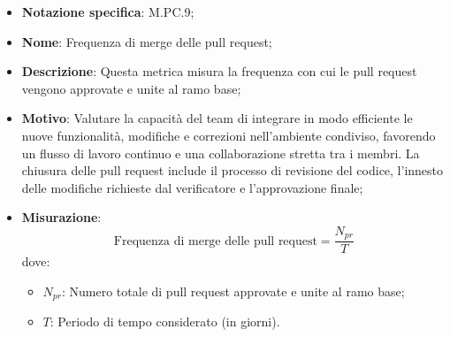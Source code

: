 \begin{itemize}
    \item \textbf{Notazione specifica}: M.PC.9;
    \item \textbf{Nome}: Frequenza di merge delle pull request;
    \item \textbf{Descrizione}: Questa metrica misura la frequenza con cui le pull request vengono approvate e unite al ramo base;
    \item \textbf{Motivo}: Valutare la capacità del team di integrare in modo efficiente le nuove funzionalità, modifiche e correzioni nell’ambiente condiviso, favorendo un flusso di lavoro continuo e una collaborazione  stretta tra i membri. La chiusura delle pull request include il processo di revisione del codice, l’innesto delle modifiche richieste dal verificatore e l’approvazione finale;
    \item \textbf{Misurazione}:
    \[
        \text{Frequenza di merge delle pull request} = \frac{N_{pr}}{T} 
    \]
    dove:
    \begin{itemize}
        \item $N_{pr}$: Numero totale di pull request approvate e unite al ramo base;
        \item $T$: Periodo di tempo considerato (in giorni).
    \end{itemize}
\end{itemize}
